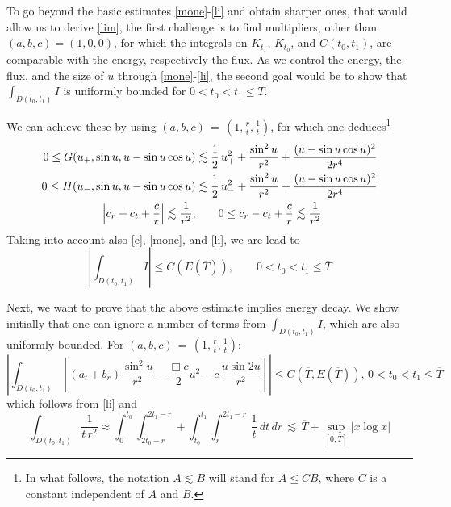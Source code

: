 \documentclass{amsart}
\begin{document}
To go beyond the basic estimates \eqref{mone}-\eqref{li} and obtain sharper ones, that would allow us to derive \eqref{lim}, the first challenge is to find multipliers, other than $(a,b,c)=(1,0,0)$, for which the integrals on $K_{t_1}$, $K_{t_0}$, and $C(t_0,t_1)$, are comparable with the energy, respectively the flux. As we control the energy, the flux, and the size of $u$ through \eqref{mone}-\eqref{li}, the second goal would be to show that $\int_{D(t_0,t_1)} I $ is uniformly bounded for $0<t_0<t_1\leq \overline{T}$.

We can achieve these by using $(a,b,c)\,=\,\left(1, \frac{r}{t}, \frac{1}{t} \right)$, for which one deduces\footnote{In what follows, the notation $A\lesssim B$ will stand for $A\leq C B$, where $C$ is a constant independent of $A$ and $B$.}
\begin{equation}
\aligned
0\leq G(u_+, \sin u, u-\sin u \cos u) &\lesssim \frac{1}{2}\,u_+^2+\frac{\sin^2u}{r^2}+\frac{(u-\sin u \cos
u)^2}{2r^4}\\
0\leq H(u_-, \sin u, u-\sin u \cos u) &\lesssim \frac{1}{2}\,u_-^2+\frac{\sin^2u}{r^2}+\frac{(u-\sin
u \cos u)^2}{2r^4}\\
\left| c_r+c_t+\frac{c}{r} \right| \lesssim \frac{1}{r^2}, &\qquad 0 \leq c_r-c_t+\frac{c}{r} \lesssim \frac{1}{r^2}
\endaligned
\label{gh}
\end{equation}
Taking into account also  \eqref{e}, \eqref{mone}, and \eqref{li}, we are lead to
\begin{equation}
\left|\int_{D(t_0,t_1)} I \right| \leq  C(E(\overline{T})), \qquad 0<t_0<t_1\leq \overline{T}\label{bi}
\end{equation}

Next, we want to prove that the above estimate implies energy decay. We show initially that one can ignore a number of terms from $\int_{D(t_0,t_1)} I $, which are also uniformly bounded. For $(a,b,c)\,=\,\left(1, \frac{r}{t}, \frac{1}{t} \right)$:
\begin{equation}
\left| \int_{D(t_0,t_1)} \left[(a_t + b_r)\frac{\sin^2u}{r^2} - \frac{\Box c}{2}u^2 - c\,\frac{u\sin 2u}{r^2}\right] \right| \leq  C(\overline{T}, E(\overline{T})) ,\, 0<t_0<t_1\leq \overline{T}
\label{bd}
\end{equation}
which follows from \eqref{li} and
\[
\int_{D(t_0,t_1)} \frac{1}{t\,r^2} \approx \int_0^{t_0}\int_{2t_0-r}^{2t_1-r} + \int_{t_0}^{t_1}\int_{r}^{2t_1-r} \, \frac{1}{t}\,dt\,dr\,\lesssim \, \overline{T} + \sup_{[0,\overline{T}]} |x \log x|
\]
\end{document}
